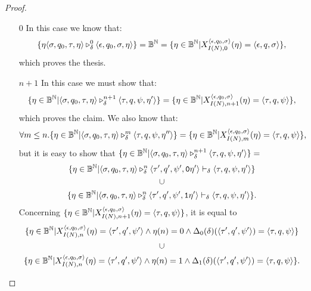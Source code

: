 \begin{proof}
\begin{itemize}
\item[$0$] In this case we know that:
\[
\{\eta \langle \sigma, q_0, \tau, \eta\rangle  \triangleright^{0}_{\delta} \langle \epsilon, q_0, \sigma, \eta\rangle \} = \mathbb{B}^{\mathbb{N}} = \{\eta \in \mathbb{B}^{\mathbb{N}}| X_{I(N), 0}^{\langle \epsilon, q_0, \sigma\rangle} (\eta)= {\langle \epsilon, q, \sigma\rangle}\},
\]
\noindent
which proves the thesis.

\item[$n+1$] In this case we must show that:
\[
\{\eta \in \mathbb{B}^{\mathbb{N}}| \langle \sigma, q_0, \tau, \eta\rangle  \triangleright^{n+1}_{\delta} \langle \tau, q, \psi, \eta'\rangle \} = \{\eta \in \mathbb{B}^{\mathbb{N}}| X_{I(N), n+1}^{\langle \epsilon, q_0, \sigma\rangle} (\eta)= {\langle \tau, q, \psi\rangle}\},
\]
which proves the claim. We also know that:
\[
\forall m\le n.\{\eta \in \mathbb{B}^{\mathbb{N}}| \langle \sigma, q_0, \tau, \eta\rangle  \triangleright^{m}_{\delta} \langle \tau, q, \psi, \eta''\rangle \} = \{\eta \in \mathbb{B}^{\mathbb{N}}| X_{I(N), m}^{\langle \epsilon, q_0, \sigma\rangle} (\eta)= {\langle \tau, q, \psi\rangle}\},
\]
but it is easy to show that $\{\eta \in \mathbb{B}^{\mathbb{N}}| \langle \sigma, q_0, \tau, \eta\rangle  \triangleright^{n+1}_{\delta} \langle \tau, q, \psi, \eta'\rangle \} =$
\begin{equation}
\label{eq:simplptm1}
\begin{gathered}
\{\eta \in \mathbb{B}^{\mathbb{N}}| \langle \sigma, q_0, \tau, \eta\rangle  \triangleright^{n}_{\delta} \langle \tau', q', \psi', \mathtt{0}\eta'\rangle \vdash_\delta  \langle \tau, q, \psi, \eta'\rangle\}\\
\cup\\
\{\eta \in \mathbb{B}^{\mathbb{N}}| \langle \sigma, q_0, \tau, \eta\rangle  \triangleright^{n}_{\delta} \langle \tau', q', \psi', \mathtt{1}\eta'\rangle \vdash_\delta  \langle \tau, q, \psi, \eta'\rangle\}.
\end{gathered}
\end{equation}
Concerning $\{\eta \in \mathbb{B}^{\mathbb{N}}| X_{I(N), n+1}^{\langle \epsilon, q_0, \sigma\rangle} (\eta)= {\langle \tau, q, \psi\rangle}\}$, it is equal to
\begin{equation}
\label {eq:simplptm2}
\begin{gathered}
\{\eta \in \Bool^\Nat| X_{I(N), n}^{\langle \epsilon, q_0, \sigma\rangle} (\eta)= {\langle \tau', q', \psi' \rangle}\land \eta(n)=0 \land \Delta_0(\delta)(\langle \tau', q', \psi' \rangle)=\langle \tau, q, \psi\rangle\}\\
\cup\\
\{\eta \in \Bool^\Nat| X_{I(N), n}^{\langle \epsilon, q_0, \sigma\rangle} (\eta)= {\langle \tau', q', \psi' \rangle}\land \eta(n)=1 \land \Delta_1(\delta)(\langle \tau', q', \psi' \rangle)=\langle \tau, q, \psi\rangle\}.

\end{gathered}
\end{equation}
\end{itemize}
\end{proof}
